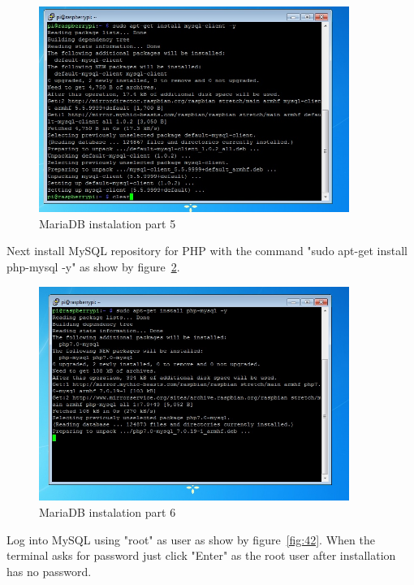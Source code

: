 \documentclass[12pt,]{article}
\begin{document}
\begin{figure}[H]
  	\begin{center}
    	\includegraphics[width=0.9\textwidth]{Ras_22}
  	\end{center}
  	\caption{MariaDB instalation part 5}
	\label{fig:40}
\end{figure}
Next install MySQL  repository for PHP with the command "sudo apt-get install php-mysql -y" as show by figure~\ref{fig:41}.
\begin{figure}[H]
  	\begin{center}
    	\includegraphics[width=0.9\textwidth]{Ras_23}
  	\end{center}
  	\caption{MariaDB instalation part 6}
	\label{fig:41}
\end{figure}
Log into MySQL using "root" as user as show by figure~\ref{fig:42}. When the terminal asks for password just click "Enter" as the root user after installation has no password.
\end{document}

